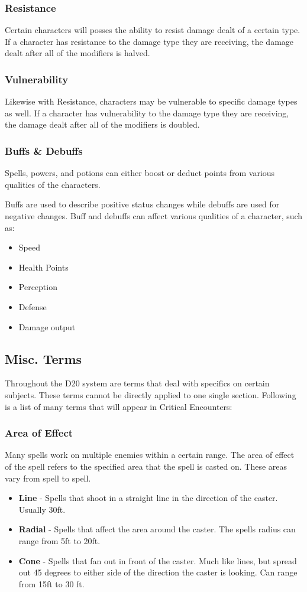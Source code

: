 \documentclass[12pt,a4paper]{report}
\begin{document}
		\subsubsection{Resistance}
			Certain characters will posses the ability to resist damage dealt of a certain type. If a character has resistance to the damage type they are receiving, the damage dealt after all of the modifiers is halved.
		\subsubsection{Vulnerability}
			Likewise with Resistance, characters may be vulnerable to specific damage types as well. If a character has vulnerability to the damage type they are receiving, the damage dealt after all of the modifiers is doubled.
		\subsubsection{Buffs \& Debuffs}
			Spells, powers, and potions can either boost or deduct points from various qualities of the characters. 
		
			Buffs are used to describe positive status changes while debuffs are used for negative changes. Buff and debuffs can affect various qualities of a character, such as:
			\begin{itemize}
				\item Speed
				\item Health Points
				\item Perception
				\item Defense
				\item Damage output
			\end{itemize}
		\subsection{Misc. Terms}
			Throughout the D20 system are terms that deal with specifics on certain subjects. These terms cannot be directly applied to one single section. Following is a list of many terms that will appear in Critical Encounters:
			\subsubsection{Area of Effect}
				Many spells work on multiple enemies within a certain range. The area of effect of the spell refers to the specified area that the spell is casted on. These areas vary from spell to spell.
				\begin{itemize}
					\item \textbf{Line} - Spells that shoot in a straight line in the direction of the caster. Usually 30ft.
					\item \textbf{Radial} - Spells that affect the area around the caster. The spells radius can range from 5ft to 20ft.
					\item \textbf{Cone} - Spells that fan out in front of the caster. Much like lines, but spread out 45 degrees to either side of the direction the caster is looking. Can range from 15ft to 30 ft.
				\end{itemize}
\end{document}

